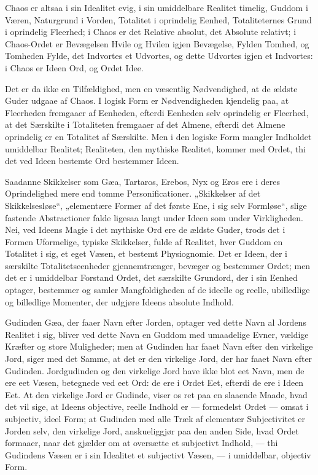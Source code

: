 \documentclass[12pt]{book}
\newcommand{\opage}[1]{\marginnote{\footnotesize\textit{[#1]}}}
\begin{document}
Chaos er altsaa i sin Idealitet evig, i sin umiddelbare
Realitet timelig, Guddom i Væren, Naturgrund i Vorden,
Totalitet i oprindelig Eenhed, Totaliteternes Grund i oprindelig
Fleerhed; i Chaos er det Relative absolut, det Absolute
relativt; i Chaos-Ordet er Bevægelsen Hvile og Hvilen
igjen Bevægelse, Fylden Tomhed, og Tomheden Fylde, det
Indvortes et Udvortes, og dette Udvortes igjen et Indvortes:
i Chaos er Ideen Ord, og Ordet Idee.

\opage{78}Det er da ikke en Tilfældighed, men en væsentlig Nødvendighed,
at de ældste Guder udgaae af Chaos. I logisk
Form er Nødvendigheden kjendelig paa, at Fleerheden fremgaaer
af Eenheden, efterdi Eenheden selv oprindelig er Fleerhed,
at det Særskilte i Totaliteten fremgaaer af det Almene,
efterdi det Almene oprindelig er en Totalitet af Særskilte.
Men i den logiske Form mangler Indholdet umiddelbar Realitet;
Realiteten, den mythiske Realitet, kommer med Ordet,
thi det ved Ideen bestemte Ord bestemmer Ideen.

Saadanne Skikkelser som Gæa, Tartaros, Erebos, Nyx
og Eros ere i deres Oprindelighed mere end tomme Personificationer.
„Skikkelser af det Skikkelsesløse“, „elementære Former
af det første Ene, i sig selv Formløse“, slige fastende Abstractioner
falde ligesaa langt under Ideen som under Virkligheden. %
Nei, ved Ideens Magie i det mythiske Ord ere de ældste
Guder, trods det i Formen Uformelige, typiske Skikkelser,
fulde af Realitet, hver Guddom en Totalitet i sig, et eget
Væsen, et bestemt Physiognomie. Det er Ideen, der i særskilte
Totalitetseenheder gjennemtrænger, bevæger og bestemmer
Ordet; men det er i umiddelbar Forstand Ordet, det særskilte
Grundord, der i sin Eenhed optager, bestemmer og samler
Mangfoldigheden af de ideelle og reelle, ubilledlige og billedlige
Momenter, der udgjøre Ideens absolute Indhold.

Gudinden Gæa, der faaer Navn efter Jorden, optager
ved dette Navn al Jordens Realitet i sig, bliver ved dette
Navn en Guddom med umaadelige Evner, vældige Kræfter
og store Muligheder; men at Gudinden har faaet Navn efter
den virkelige Jord, siger med det Samme, at det er den
virkelige Jord, der har faaet Navn efter Gudinden. Jordgudinden
og den virkelige Jord have ikke blot eet Navn, men
de ere eet Væsen, betegnede ved eet Ord: de ere i Ordet Eet,
efterdi de ere i Ideen Eet. At den virkelige Jord er Gudinde,
viser os ret paa en slaaende Maade, hvad det vil sige,
at Ideens objective, reelle Indhold er --- formedelst Ordet ---
\opage{79}omsat i subjectiv, ideel Form; at Gudinden med alle Træk
af elementær Subjectivitet er Jorden selv, den virkelige Jord,
anskueliggjør paa den anden Side, hvad Ordet formaaer, naar
det gjælder om at oversætte et subjectivt Indhold, --- thi Gudindens
Væsen er i sin Idealitet et subjectivt Væsen, --- i
umiddelbar, objectiv Form.
\end{document}
